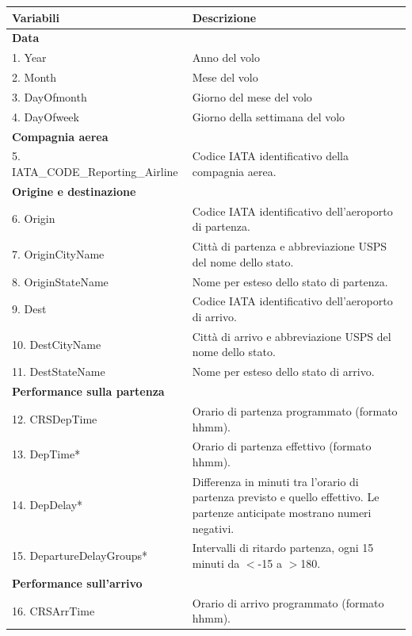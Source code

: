 \documentclass[12pt]{article}
\begin{document}
\renewcommand{\arraystretch}{1.5}
\begin{longtable}{ L{6.2cm} L{10.3cm} }
    
    \hline
    \textbf{Variabili} & \textbf{Descrizione} \\\hline \endhead
    \hline
        \textbf{Data}\\
        1. Year & Anno del volo\\ 
        2. Month & Mese del volo \\
        3. DayOfmonth& Giorno del mese del volo\\
        4. DayOfweek& Giorno della settimana del volo\\
    \hline
        \textbf{Compagnia aerea}\\
        5. IATA\_CODE\_Reporting\_Airline& Codice IATA identificativo della compagnia aerea.\\
    \hline    
        \textbf{Origine e destinazione}\\
        6. Origin&Codice IATA identificativo dell'aeroporto di partenza.\\
        7. OriginCityName&Città di partenza e abbreviazione USPS del nome dello stato.\\
        8. OriginStateName&Nome per esteso dello stato di partenza.\\
        9. Dest&Codice IATA identificativo dell'aeroporto di arrivo.\\
        10. DestCityName&Città di arrivo e abbreviazione USPS del nome dello stato.\\
        11. DestStateName&Nome per esteso dello stato di arrivo.\\
    \hline    
        \textbf{Performance sulla partenza}\\
        12. CRSDepTime&Orario di partenza programmato  (formato hhmm).\\
        13. DepTime*&Orario di partenza effettivo (formato hhmm).\\
        14. DepDelay*&Differenza in minuti tra l'orario di partenza previsto e quello effettivo. Le partenze anticipate mostrano numeri negativi. \\
        15. DepartureDelayGroups*&Intervalli di ritardo partenza, ogni 15 minuti da $<$-15 a $>$180. \\
    \hline
        \textbf{Performance sull'arrivo}\\
        16. CRSArrTime& Orario di arrivo programmato (formato hhmm).\\

\end{longtable}
\end{document}
